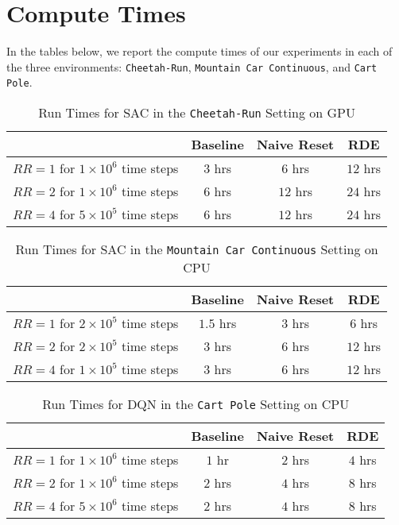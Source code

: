 \documentclass[base]{subfiles}
\begin{document}
\section{Compute Times} \label{app:d}

In the tables below, we report the compute times of our experiments in each of the three environments: \texttt{Cheetah-Run}, \texttt{Mountain Car Continuous}, and \texttt{Cart Pole}.

\begin{table}[h]
	\caption{Run Times for SAC in the \texttt{Cheetah-Run} Setting on GPU}
	\label{tab:cheetah_times}
	\centering
	\begin{tabular}{cccc}
		\toprule
		                                      & Baseline & Naive Reset & RDE      \\
		\hline
		$RR=1$ for $1 \times 10^6$ time steps & $3$ hrs  & $6$ hrs     & $12$ hrs \\
		\hline
		$RR=2$ for $1 \times 10^6$ time steps & $6$ hrs  & $12$ hrs    & $24$ hrs \\
		\hline
		$RR=4$ for $5 \times 10^5$ time steps & $6$ hrs  & $12$ hrs    & $24$ hrs \\
		\bottomrule
	\end{tabular}
\end{table}

\begin{table}[h]
	\caption{Run Times for SAC in the \texttt{Mountain Car Continuous} Setting on CPU}
	\label{tab:mc_times}
	\centering
	\begin{tabular}{cccc}
		\toprule
		                                      & Baseline  & Naive Reset & RDE      \\
		\hline
		$RR=1$ for $2 \times 10^5$ time steps & $1.5$ hrs & $3$ hrs     & $6$ hrs  \\
		\hline
		$RR=2$ for $2 \times 10^5$ time steps & $3$ hrs   & $6$ hrs     & $12$ hrs \\
		\hline
		$RR=4$ for $1 \times 10^5$ time steps & $3$ hrs   & $6$ hrs     & $12$ hrs \\
		\bottomrule
	\end{tabular}
\end{table}

\begin{table}[h]
	\caption{Run Times for DQN in the \texttt{Cart Pole} Setting on CPU}
	\label{tab:cp_times}
	\centering
	\begin{tabular}{c|c|c|c}
		\toprule
		                                      & Baseline & Naive Reset & RDE     \\
		\hline
		$RR=1$ for $1 \times 10^6$ time steps & $1$ hr   & $2$ hrs     & $4$ hrs \\
		\hline
		$RR=2$ for $1 \times 10^6$ time steps & $2$ hrs  & $4$ hrs     & $8$ hrs \\
		\hline
		$RR=4$ for $5 \times 10^6$ time steps & $2$ hrs  & $4$ hrs     & $8$ hrs \\
		\bottomrule
	\end{tabular}
\end{table}
\end{document}
